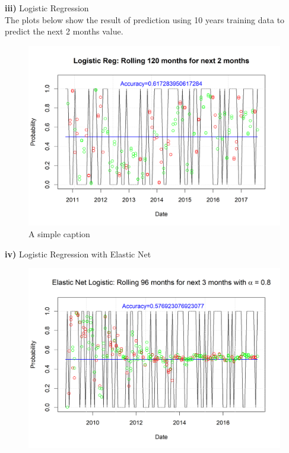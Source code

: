 \documentclass[12pt]{amsart}
\begin{document}
\newpage

\textbf{iii)} Logistic Regression\\
The plots below show the result of prediction using 10 years training data to predict the next 2 months value.
\begin{figure}[htb]
	\includegraphics[scale=0.9]{IYW_logistic_reg_rolling}
	\caption{A simple caption \label{overflow}}
\end{figure}


\textbf{iv)} Logistic Regression with Elastic Net\\

\begin{figure}[htb]
	\includegraphics[scale=0.9]{IYW_logistic_elastic_rolling}
\end{figure}
\end{document}
